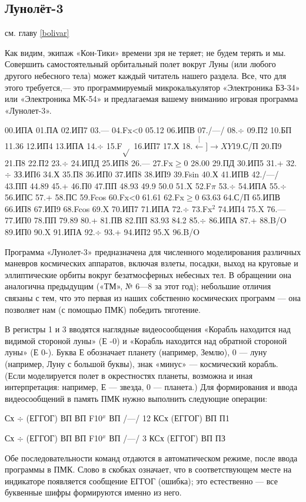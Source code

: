 \documentclass[11pt,a4paper,oneside]{article}
\def\XY{$\stackrel[\leftarrow]{\rightarrow}{XY}$}
\begin{document}
\subsection{Лунолёт-3}
см. главу \ref{bolivar}

Как видим, экипаж «Кон-Тики» времени зря не теряет; не будем терять и мы. Совершить самостоятельный орбитальный полет вокруг Луны (или любого другого небесного тела) может каждый читатель нашего раздела. Все, что для этого требуется,— это программируемый микрокалькулятор «Электроника БЗ-34» или «Электроника МК-54» и предлагаемая вашему вниманию игровая программа «Лунолет-3».

00.ИПА 01.ПА 02.ИП7 03.— 04.Fx<0 05.12 06.ИПВ 07./—/ 08.$\div$ 09.П2 10.БП 11.36 12.ИП4 13.ИПА 14.$\div$ 15.F$\sqrt{}$
16.ИП7 17.Х 18.\XY 19.С/П 20.П9 21.П8 22.П2 23.$\div$ 24.ИПД 25.ИП8 26.— 27.Fx$\geq$0 28.00 29.ПД 30.ИП5 31.+
32.$\div$ ЗЗ.ИП6 34.Х 35.П8 36.ИП0
37.ИП8 38.ИП9 39.Fsin 40.Х 41.ИПВ
42./—/ 43.ПП 44.89 45.+ 46.П0 47.ПП 48.93 49.9 50.0 51.X 52.F$\pi$ 53.$\div$ 54.ИПА
55.$\div$ 56.ИПС 57.+ 58.ПС 59.Fcos 60.Fx<0 61.61 62.Fx$\geq$0 63.63 64.С/П 65.ИПВ 66.ИП8 67.ИП9 68.Fcos 69.X 70.ИП7 71.ИПА 72.$\div$ 73.Fx$^{2}$ 74.ИП4 75.X 76.— 77.ИП0 78.ПП 79.89 80.+ 81.ПВ 82.ПП 83.93 84.2 85.$\div$ 86.ИПА 87.+ 88.B/O 89.ИП0 90.X 91.ИПА 92.$\div$ 93.+ 94.ИП2 95.X 96.B/O

Программа «Лунолет-3» предназначена для численного моделирования различных маневров космических аппаратов, включая взлеты, посадки, выход на круговые и эллиптические орбиты вокруг безатмосферных небесных тел. В обращении она аналогична предыдущим («ТМ», № 6—8 за этот год); небольшие отличия связаны с тем, что это первая из наших собственно космических программ — она позволяет нам (с помощью ПМК) победить тяготение.

В регистры 1 и 3 вводятся наглядные видеосообщения «Корабль находится над видимой стороной луны» (Е -0) и «Корабль находится над обратной стороной луны» (Е 0-). Буква Е обозначает планету (например, Землю), 0 — луну (например, Луну с большой буквы), знак «минус» — космический корабль. (Если моделируется полет в окрестностях планеты, возможна и иная интерпретация: например, Е — звезда, 0 — планета.) Для формирования и ввода видеосообщений в память ПМК нужно выполнить следующие операции:

Сх $\div$ (ЕГГОГ) ВП ВП F10$^{x}$ ВП /—/ 12 КСх (ЕГГОГ) ВП П1

Сх $\div$ (ЕГГОГ) ВП ВП F10$^{x}$ ВП /—/ 3 КСх (ЕГГОГ) ВП ПЗ

Обе последовательности команд отдаются в автоматическом режиме, после ввода программы в ПМК. Слово в скобках означает, что в соответствующем месте на индикаторе появляется сообщение ЕГГОГ (ошибка); это естественно — все буквенные шифры формируются именно из него.
\end{document}
